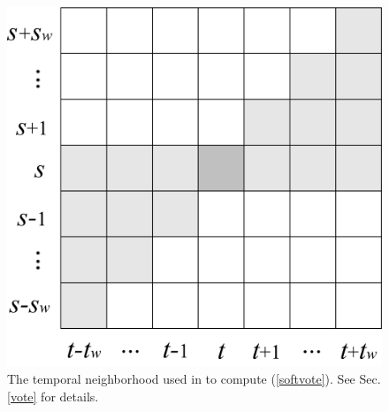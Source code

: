 \begin{figure}[t]
\vspace{-5pt}
\begin{center}
\includegraphics[scale=0.3]{neighbor2.png}
\end{center}
\caption{The temporal neighborhood used in to compute (\ref{softvote}). See Sec. \ref{vote} for details.}
\label{all_illu}
\vspace{-5pt}
\end{figure}

